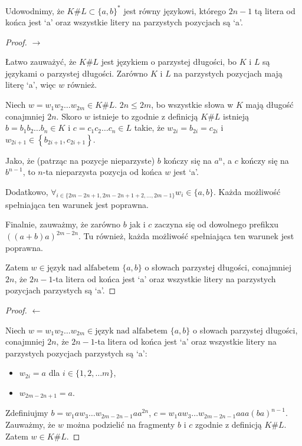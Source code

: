 \documentclass{article}
\theoremstyle{definition}
\theoremstyle{remark}
\begin{document}
Udowodnimy, że \(K \# L \subset \{ a, b \}^*\) jest równy językowi, którego
\(2n-1\) tą litera od końca jest `a' oraz wszystkie litery na parzystych
pozycjach są `a'.

\begin{proof}

    \(\rightarrow\)

    Łatwo zauważyć, że \(K \# L\) jest językiem o parzystej długości, bo \(K\) i \(L\) są językami o parzystej długości.
    Zarówno \(K\) i \(L\) na parzystych pozycjach mają literę `a', więc \(w\) również.

    Niech \(w = w_1 w_2 \ldots w_{2m} \in K \# L\). \(2n \leq 2m\), bo wszystkie
    słowa w \(K\) mają długość conajmniej \(2n\). Skoro \(w\) istnieje to zgodnie z
    definicją \(K \# L\) istnieją \(b=b_1 b_2 \ldots b_n \in K\) i \(c=c_1 c_2
    \ldots c_n \in L\) takie, że \(w_{2i} = b_{2i} = c_{2i}\) i \(w_{2i+1} \in
    \left\{ b_{2i+1}, c_{2i+1} \right\}\).

    Jako, że (patrząc na pozycje nieparzyste) \(b\) kończy się na \(a^n\), a \(c\)
    kończy się na \(b^{n-1}\), to \(n\)-ta nieparzysta pozycja od końca \(w\) jest
    `a'.

    Dodatkowo, \( \forall_{i \in \{2m - 2n + 1, 2m - 2n + 1 + 2, \ldots, 2m - 1 \}}
    w_i \in \{ a,b \}\). Każda możliwość spełniająca ten warunek jest poprawna.

    Finalnie, zauważmy, że zarówno \(b\) jak i \(c\) zaczyna się od dowolnego
    prefikxu \( ((a+b)a)^{2m-2n} \). Tu również, każda możliwość spełniająca ten
    warunek jest poprawna.

    Zatem \(w \in \text{język nad alfabetem } \{ a, b \}\) o słowach parzystej
    długości, conajmniej \(2n\), że \(2n-1\)-ta litera od końca jest `a' oraz
    wszystkie litery na parzystych pozycjach parzystych są `a'.

\end{proof}

\begin{proof}

    \(\leftarrow\)

    Niech \(w = w_1 w_2 \ldots w_{2m}\in \text{język nad alfabetem } \{ a, b \}\) o
    słowach parzystej długości, conajmniej \(2n\), że \(2n-1\)-ta litera od końca
    jest `a' oraz wszystkie litery na parzystych pozycjach parzystych są `a':

    \begin{itemize} 
        \item \(w_{2i} = a\) dla \(i \in \{1, 2, \ldots m\}\),
        \item \(w_{2m-2n+1} = a\).
    \end{itemize}

    Zdefiniujmy \(b = w_1 a w_3 \ldots w_{2m-2n-1} a a^{2n}\), \(c = w_1 a w_3
    \ldots w_{2m-2n-1} a a a (ba)^{n-1}\). Zauważmy, że \(w\) można podzielić na
    fragmenty \(b\) i \(c\) zgodnie z definicją \(K \# L\). Zatem \(w \in K \# L\).

\end{proof}
\end{document}
